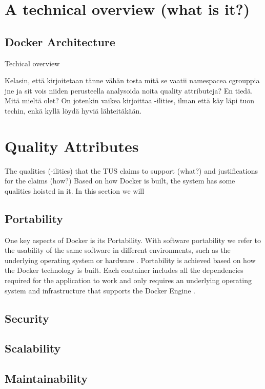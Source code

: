 \documentclass[fleqn,12pt]{olplainarticle}
\begin{document}
\section*{A technical overview (what is it?)}

\subsection*{Docker Architecture}
Techical overview

Kelasin, että kirjoitetaan tänne vähän tosta mitä se vaatii namespacea cgrouppia jne ja sit vois niiden perusteella analysoida noita quality attributeja? En tiedä. Mitä mieltä olet? On jotenkin vaikea kirjoittaa -ilities, ilman että käy läpi tuon techin, enkä kyllä löydä hyviä lähteitäkään. 

\section*{ Quality Attributes}

The qualities (-ilities) that the TUS claims to support (what?) and justifications for the claims (how?)
Based on how Docker is built, the system has some qualities hoisted in it. In this section we will 

\subsection*{Portability}
One key aspects of Docker is its Portability. With software portability we refer to the usability of the same software in different environments, such as the underlying operating system or hardware \citep{wiki:Software_portability}. Portability is achieved based on how the Docker technology is built. Each container includes all the dependencies required for the application to work and only requires an underlying operating system and infrastructure that supports the Docker Engine \citep{hy:DevOps_with_Docker}.
\subsection*{Security}
\subsection*{Scalability}
\subsection*{Maintainability}
\end{document}
